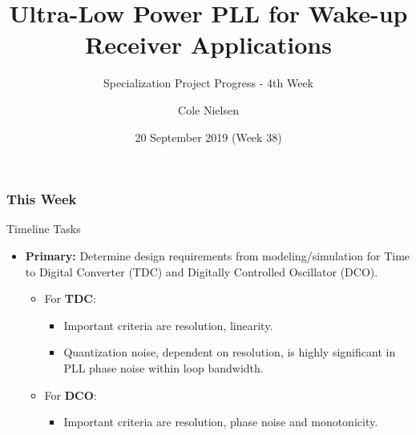 \documentclass[t, screen, aspectratio=43]{beamer}
\title[Short title]{Ultra-Low Power PLL for Wake-up Receiver Applications}
\subtitle{Specialization Project Progress - 4th Week}
\author[C Nielsen]{Cole Nielsen}
\institute[NTNU]{Department of Electronic Systems, NTNU}
\date{20 September 2019 (Week 38)}
\begin{document}
\begin{frame}
	\titlepage%
\end{frame}



\begin{frame}
	\frametitle{This Week}
	\begin{block}{Timeline Tasks}
		\begin{itemize}
			\footnotesize
			\item \textbf{Primary:} Determine design requirements from modeling/simulation for Time to Digital Converter (TDC) and Digitally Controlled Oscillator (DCO).
			\begin{itemize}
				\footnotesize
				\item For \textbf{TDC}:
				\begin{itemize}
					\item Important criteria are resolution, linearity.
					\item Quantization noise, dependent on resolution, is highly significant in PLL phase noise within loop bandwidth.
				\end{itemize} 
				\item For \textbf{DCO}:	
				\begin{itemize}
					\footnotesize
					\item Important criteria are resolution, phase noise and monotonicity. 
				\end{itemize}
			\end{itemize} 
		\end{itemize}    
	\end{block}
\end{frame}

\end{document}
